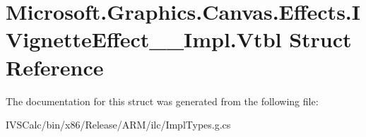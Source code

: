 \hypertarget{struct_microsoft_1_1_graphics_1_1_canvas_1_1_effects_1_1_i_vignette_effect_____impl_1_1_vtbl}{}\section{Microsoft.\+Graphics.\+Canvas.\+Effects.\+I\+Vignette\+Effect\+\_\+\+\_\+\+Impl.\+Vtbl Struct Reference}
\label{struct_microsoft_1_1_graphics_1_1_canvas_1_1_effects_1_1_i_vignette_effect_____impl_1_1_vtbl}


The documentation for this struct was generated from the following file\+:\begin{DoxyCompactItemize}
\item 
I\+V\+S\+Calc/bin/x86/\+Release/\+A\+R\+M/ilc/Impl\+Types.\+g.\+cs\end{DoxyCompactItemize}
